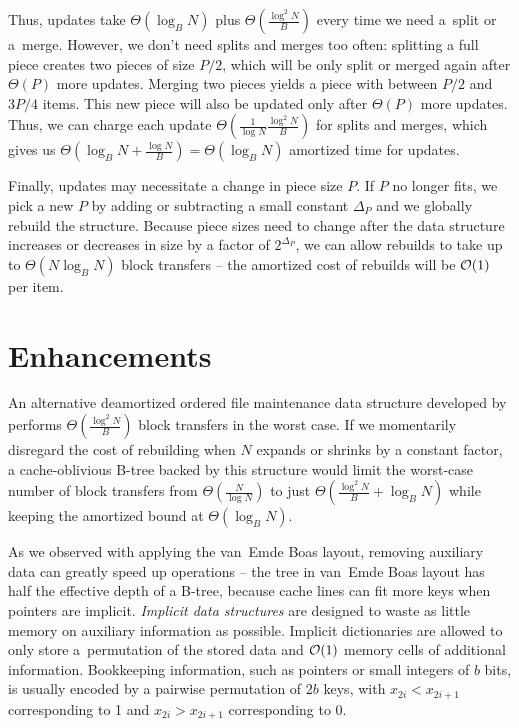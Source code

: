 Thus, updates take $\Theta(\log_B N)$ plus $\Theta(\frac{\log^2 N}{B})$
every time we need a~split or a~merge. However, we don't need splits and
merges too often: splitting a full piece creates two pieces of size $P/2$,
which will be only split or merged again after $\Theta(P)$ more updates.
Merging two pieces yields a piece with between $P/2$ and $3P/4$ items.
This new piece will also be updated only after $\Theta(P)$ more updates.
Thus, we can charge each update $\Theta(\frac{1}{\log N}\frac{\log^2 N}{B})$
for splits and merges, which gives us $\Theta(\log_B N+\frac{\log N}{B})=
\Theta(\log_B N)$ amortized time for updates.

Finally, updates may necessitate a change in piece size $P$. If $P$
no longer fits, we pick a new $P$ by adding or subtracting a small constant
$\Delta_P$ and we globally rebuild the structure.
Because piece sizes need to change after the data structure increases
or decreases in size by a factor of $2^{\Delta_P}$, we can allow
rebuilds to take up to $\Theta(N\log_B N)$ block transfers -- the amortized
cost of rebuilds will be $\mathcal{O}(1)$ per item.

\section{Enhancements}
An alternative deamortized ordered file maintenance data structure
developed by \cite{willard92} performs $\Theta(\frac{\log^2 N}{B})$
block transfers in the worst case. If we momentarily disregard the cost of
rebuilding when $N$ expands or shrinks by a constant factor, a cache-oblivious
B-tree backed by this structure would limit the worst-case number of block
transfers from $\Theta(\frac{N}{\log N})$ to just
$\Theta(\frac{\log^2 N}{B}+\log_B N)$ while keeping the amortized bound
at $\Theta(\log_B N)$.

As we observed with applying the van~Emde Boas layout, removing auxiliary
data can greatly speed up operations -- the tree in van~Emde Boas layout has
half the effective depth of a B-tree, because cache lines can fit more keys
when pointers are implicit.
\emph{Implicit data structures} are designed to waste as little memory on
auxiliary information as possible. Implicit dictionaries are allowed to only
store a~permutation of the stored data and $\mathcal{O}(1)$ memory cells of additional
information. Bookkeeping information, such as pointers or small integers
of $b$ bits, is usually encoded by a pairwise permutation of $2b$ keys,
with $x_{2i} < x_{2i+1}$ corresponding to 1 and $x_{2i} > x_{2i+1}$
corresponding to 0.

